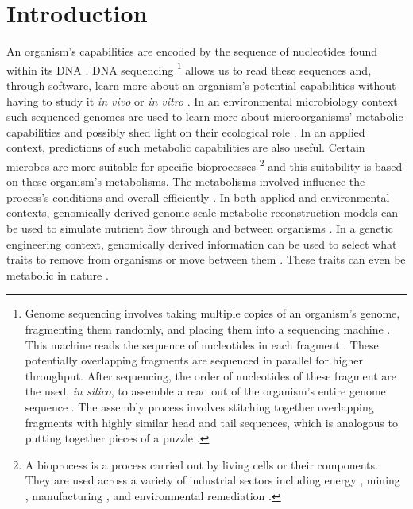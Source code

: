 \chapter{Introduction}

An organism's capabilities are encoded by the sequence of nucleotides found within its DNA \cite{crick1970central}. DNA sequencing \footnote{Genome sequencing involves taking multiple copies of an organism's genome, fragmenting them randomly, and placing them into a sequencing machine \cite{shendure2017dna}. This machine reads the sequence of nucleotides in each fragment \cite{shendure2017dna}. These potentially overlapping fragments are sequenced in parallel for higher throughput. After sequencing, the order of nucleotides of these fragment are the used, \textit{in silico}, to assemble a read out of the organism's entire genome sequence \cite{wajid2012review}. The assembly process involves stitching together overlapping fragments with highly similar head and tail sequences, which is analogous to putting together pieces of a puzzle \cite{wajid2012review}.} allows us to read these sequences and, through software, learn more about an organism's potential capabilities without having to study it \textit{in vivo} or \textit{in vitro} \cite{de2012bioinformatic}. In an environmental microbiology context such sequenced genomes are used to learn more about microorganisms' metabolic capabilities and possibly shed light on their ecological role \cite{de2012bioinformatic}. In an applied context, predictions of such metabolic capabilities are also useful. Certain microbes are more suitable for specific bioprocesses \footnote{A bioprocess is a process carried out by living cells or their components. They are used across a variety of industrial sectors including energy \cite{deublein2011biogas}, mining \cite{dew1997biox}, manufacturing \cite{thodey2014microbial}, and environmental remediation \cite{alexander1999biodegradation}.} and this suitability is based on these organism's metabolisms. The metabolisms involved influence the process's conditions and overall efficiently \cite{doran1995bioprocess,liu2016bioprocess}. In both applied and environmental contexts, genomically derived genome-scale metabolic reconstruction models can be used to simulate nutrient flow through and between organisms \cite{magnusdottir2017generation, arkin2018kbase, faria2018improving}. In a genetic engineering context, genomically derived information can be used to select what traits to remove from organisms or move between them \cite{strohl2001biochemical}. These traits can even be metabolic in nature \cite{sanchez2005novel}.


